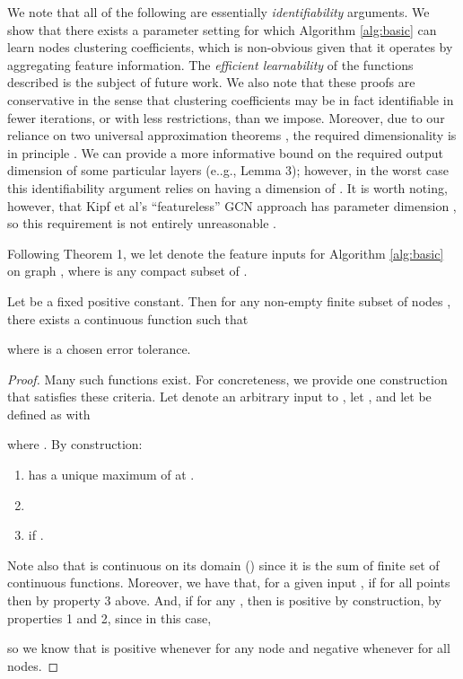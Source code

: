 We note that all of the following are essentially {\em identifiability} arguments. 
We show that there exists a parameter setting for which Algorithm \ref{alg:basic} can learn nodes clustering coefficients, which is non-obvious given that it operates by aggregating feature information.
The {\em efficient learnability} of the functions described is the subject of future work. 
We also note that these proofs are conservative in the sense that clustering coefficients may be in fact identifiable in fewer iterations, or with less restrictions, than we impose. 
Moreover, due to our reliance on two universal approximation theorems \cite{hornik1991approximation,qi2016pointnet}, the required dimensionality is in principle .
We can provide a more informative bound on the required output dimension of some particular layers (e..g., Lemma 3); however, in the worst case this identifiability argument relies on having a dimension of . 
It is worth noting, however,  that Kipf et al's ``featureless'' GCN approach has parameter dimension , so this requirement is not entirely unreasonable \cite{kipf2016semi,kipf2016variational}.

Following Theorem 1, we let  denote the feature inputs for Algorithm \ref{alg:basic} on graph , where  is any compact subset of .

\begin{lemma}
Let  be a fixed positive constant. 
Then for any non-empty finite subset of nodes , there exists a continuous function  such that 

where  is a chosen error tolerance. 
\end{lemma}
\begin{proof}
Many such functions exist. For concreteness, we provide one construction that satisfies these criteria. 
Let  denote an arbitrary input to , let , and let  be defined as  with
\newcommand{\setsize}{|\mathcal{D}|}

where .
By construction:
\begin{enumerate}
\item
	 has a unique maximum of  at . 
\item
	
\item 
    if . 
\end{enumerate}
Note also that  is continuous on its domain () since it is the sum of finite set of continuous functions. 
Moreover, we have that, for a given input , if  for all points  then  by property 3 above. 
And, if  for any , then  is positive by construction, by properties 1 and 2, since in this case,

 so we know that  is positive whenever  for any node and negative whenever  for all nodes.  
\end{proof}

